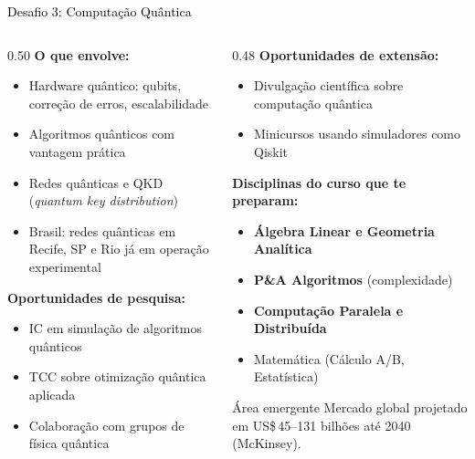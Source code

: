 \documentclass[aspectratio=169]{beamer}
\newcommand{\impt}[1]{\textcolor{morange}{\textbf{#1}}}
\newcommand{\ntc}[1]{\textcolor{mblue}{#1}}
\newcommand{\cc}[1]{\textcolor{mcc}{\textbf{#1}}}
\newcommand{\ia}[1]{\textcolor{mia}{\textbf{#1}}}
\begin{document}
\begin{frame}{\colorbox{dsfqua}{\textcolor{black}{Desafio 3: Computação Quântica}}}
  \footnotesize
  \begin{columns}[T]
    \begin{column}{0.50\textwidth}
      \textbf{O que envolve:}
      \begin{itemize}\setlength\itemsep{3pt}
        \item Hardware quântico: qubits, correção de erros, escalabilidade
        \item Algoritmos quânticos com vantagem prática
        \item Redes quânticas e QKD (\emph{quantum key distribution})
        \item Brasil: redes quânticas em Recife, SP e Rio já em operação experimental
      \end{itemize}
      \vspace{0.2cm}
      \textbf{Oportunidades de \impt{pesquisa}:}
      \begin{itemize}\setlength\itemsep{2pt}
        \item IC em simulação de algoritmos quânticos
        \item TCC sobre otimização quântica aplicada
        \item Colaboração com grupos de física quântica
      \end{itemize}
    \end{column}
    \begin{column}{0.48\textwidth}
      \textbf{Oportunidades de \ntc{extensão}:}
      \begin{itemize}\setlength\itemsep{2pt}
        \item Divulgação científica sobre computação quântica
        \item Minicursos usando simuladores como Qiskit
      \end{itemize}
      \vspace{0.2cm}
      \textbf{Disciplinas do curso que te preparam:}
      \begin{itemize}\setlength\itemsep{2pt}
        \item \cc{Álgebra Linear e Geometria Analítica}
        \item \cc{P\&A Algoritmos} (complexidade)
        \item \ia{Computação Paralela e Distribuída}
        \item Matemática (Cálculo A/B, Estatística)
      \end{itemize}
      \begin{alertblock}{\small Área emergente}
        Mercado global projetado em US\$\,45--131 bilhões até 2040 (McKinsey).
      \end{alertblock}
    \end{column}
  \end{columns}
\end{frame}
\end{document}
